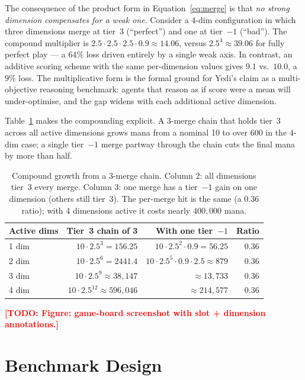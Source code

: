 \documentclass[11pt]{article}
\newcommand{\todo}[1]{\textcolor{red}{\textbf{[TODO: #1]}}}
\begin{document}
The consequence of the product form in Equation~\eqref{eq:merge} is that
\emph{no strong dimension compensates for a weak one}. Consider a 4-dim
configuration in which three dimensions merge at tier~3 (``perfect'') and
one at tier~$-1$ (``bad''). The compound multiplier is
$2.5 \cdot 2.5 \cdot 2.5 \cdot 0.9 \approx 14.06$, versus
$2.5^4 \approx 39.06$ for fully perfect play --- a $64\%$ loss driven
entirely by a single weak axis. In contrast, an additive scoring scheme
with the same per-dimension values gives $9.1$ vs.\ $10.0$, a $9\%$ loss.
The multiplicative form is the formal ground for Yedi's claim as a
multi-objective reasoning benchmark: agents that reason as if score were a
mean will under-optimise, and the gap widens with each additional active
dimension.

Table~\ref{tab:chain} makes the compounding explicit. A 3-merge chain that
holds tier~3 across all active dimensions grows mana from a nominal 10 to
over 600 in the 4-dim case; a single tier~$-1$ merge partway through the
chain cuts the final mana by more than half.

\begin{table}[h]
\centering
\small
\begin{tabular}{@{}lrrr@{}}
\toprule
\textbf{Active dims} & \textbf{Tier~3 chain of 3} & \textbf{With one tier~$-1$} & \textbf{Ratio} \\
\midrule
1 dim & $10 \cdot 2.5^3 = 156.25$ & $10 \cdot 2.5^2 \cdot 0.9 = 56.25$ & $0.36$ \\
2 dim & $10 \cdot 2.5^6 = 2441.4$ & $10 \cdot 2.5^5 \cdot 0.9 \cdot 2.5 \approx 879$ & $0.36$ \\
3 dim & $10 \cdot 2.5^9 \approx 38{,}147$ & $\approx 13{,}733$ & $0.36$ \\
4 dim & $10 \cdot 2.5^{12} \approx 596{,}046$ & $\approx 214{,}577$ & $0.36$ \\
\bottomrule
\end{tabular}
\caption{Compound growth from a 3-merge chain. Column 2: all dimensions
tier~3 every merge. Column 3: one merge has a tier~$-1$ gain on one
dimension (others still tier~3). The per-merge hit is the same (a $0.36$
ratio); with 4 dimensions active it costs nearly $400{,}000$ mana.}
\label{tab:chain}
\end{table}

\todo{Figure: game-board screenshot with slot + dimension annotations.}


\section{Benchmark Design}
\label{sec:benchmark}
\end{document}
